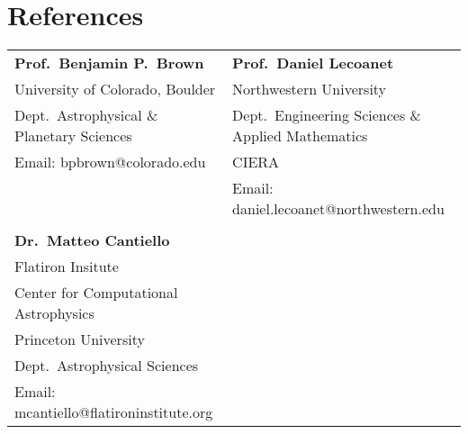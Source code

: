 \section{References}

\begin{tabular}{ll}
    \textbf{Prof.~Benjamin P.~Brown} 					    &\hspace{0.25in} \textbf{Prof.~Daniel Lecoanet}  					\\
    University of Colorado, Boulder   			            &\hspace{0.25in} Northwestern University 	\\
    \hspace{0.2in}Dept.~Astrophysical \& Planetary Sciences &\hspace{0.45in} Dept.~Engineering Sciences \& Applied Mathematics 												\\
    Email: bpbrown@colorado.edu							    &\hspace{0.45in} CIERA     						\\
													        &\hspace{0.25in} Email: daniel.lecoanet@northwestern.edu             \\
                                                    \\

     \textbf{Dr.~Matteo Cantiello}	&	\\
     Flatiron Insitute      &      \\
     \hspace{0.2in}Center for Computational Astrophysics    	 &			\\
     Princeton University                       &            \\
     \hspace{0.2in}Dept.~Astrophysical Sciences & \\
     Email: mcantiello@flatironinstitute.org & \\
\end{tabular}


